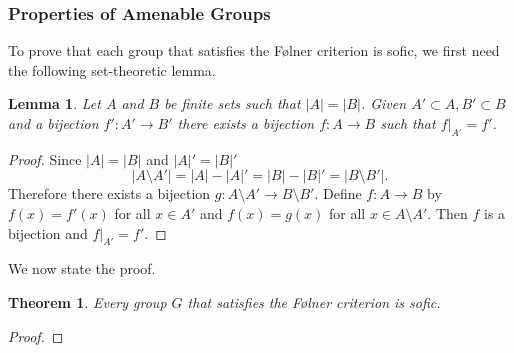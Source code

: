 \documentclass[titlepage, a4paper]{article}
\newcommand{\card}[1]{\left| #1 \right|}
\newtheorem{theorem}{Theorem}
\newtheorem{lemma}{Lemma}
\theoremstyle{remark}
\begin{document}
\subsubsection{Properties of Amenable Groups}

To prove that each group that satisfies the Følner criterion is sofic, we first need the following set-theoretic lemma.

\begin{lemma}\label{lem:finite_bijections} 
        Let $A$ and $B$ be finite sets such that $|A| = |B|$. Given $A' \subset A, B' \subset B$ and a bijection $f': A' \to B'$ there exists a bijection $f: A \to B$ such that $f|_{A'} = f'$. 
    \end{lemma}
    \begin{proof}
        Since $\card A = \card B$ and $\card A' = \card B'$
        \[
        \card{A \setminus A'} = \card A - \card A' = \card B - \card B' = \card{B \setminus B'}.
        \]
        Therefore there exists a bijection $g: A \setminus A' \to B \setminus B'$. Define $f: A  \to B$ by $f(x) = f'(x)$ for all $x \in A'$ and $f(x)=g(x)$ for all $x \in A \setminus A'$. Then $f$ is a bijection and $f|_{A'} = f'$.
    \end{proof}

We now state the proof.

 	\begin{theorem}\label{thm:folner_sofic}
        Every group $G$ that satisfies the Følner criterion is sofic.
    \end{theorem}
    \begin{proof}
        
 	\end{proof}
\end{document}
